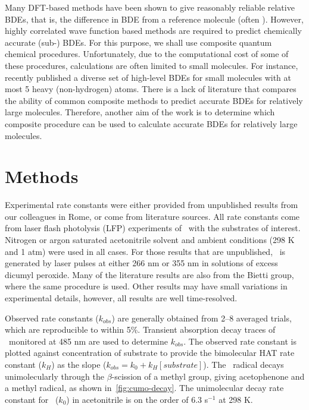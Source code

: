 Many DFT-based methods have been shown to give reasonably reliable relative
BDEs, that is, the difference in BDE from a reference molecule (often
).\cite{DiLabio1999, Chan2012, Wiberg2014} However, highly correlated
wave function based methods are required to predict chemically accurate
(sub-\kcalmol) BDEs. For this purpose, we shall use composite quantum chemical
procedures. Unfortunately, due to the computational cost of some of these
procedures, calculations are often limited to small molecules. For instance,
\citet{Chan2012} recently published a diverse set of high-level BDEs for small
molecules with at most 5 heavy (non-hydrogen) atoms. There is a lack of
literature that compares the ability of common composite methods to predict
accurate  BDEs for relatively large molecules. Therefore, another aim
of the work is to determine which composite procedure can be used to calculate
accurate BDEs for relatively large molecules.

\section{Methods}\label{sec:hat-methods}

Experimental rate constants were either provided from unpublished results from
our colleagues in Rome, or come from literature sources.\cite{Bietti2010,
Bietti2011, Pischel2001, Salamone2011, Salamone2012, Salamone2012a,
Salamone2013, Salamone2015} All rate constants come from laser flash photolysis
(LFP) experiments of \cumo\ with the substrates of interest. Nitrogen or argon
saturated acetonitrile solvent and ambient conditions (298 K and 1 atm) were
used in all cases. For those results that are unpublished, \cumo\ is generated
by laser pulses at either 266 nm or 355 nm in solutions of excess dicumyl
peroxide. Many of the literature results are also from the Bietti group, where
the same procedure is used. Other results may have small variations in
experimental details, however, all results are well time-resolved.

Observed rate constants ($k_{obs}$) are generally obtained from 2--8 averaged
trials, which are reproducible to within 5\%. Transient absorption decay traces
of \cumo\ monitored at 485 nm are used to determine $k_{obs}$. The observed
rate constant is plotted against concentration of substrate to provide the
bimolecular HAT rate constant ($k_H$) as the slope ($k_{obs} = k_0 +
k_H[substrate]$). The \cumo\ radical decays unimolecularly through the
$\beta$-scission of a methyl group, giving acetophenone and a methyl radical,
as shown in~\ref{fig:cumo-decay}. The unimolecular decay rate
constant\cite{Avila1993, Avila1995} for \cumo\ ($k_0$) in acetonitrile is on
the order of 6.3  s$^{-1}$ at 298 K.

